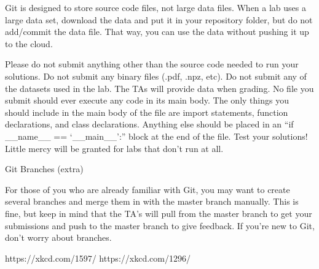 Git is designed to store source code files, not large data files. When a lab uses a large data set, download the data and put it in your repository folder, but do not add/commit the data file. That way, you can use the data without pushing it up to the cloud.

Please do not submit anything other than the source code needed to run your solutions.
Do not submit any binary files (.pdf, .npz, etc).
Do not submit any of the datasets used in the lab. The TAs will provide data when grading.
No file you submit should ever execute any code in its main body. The only things you should include in the main body of the file are import statements, function declarations, and class declarations. Anything else should be placed in an “if \_\_name\_\_ == ‘\_\_main\_\_':” block at the end of the file.
Test your solutions! Little mercy will be granted for labs that don't run at all.

Git Branches (extra)

For those of you who are already familiar with Git, you may want to create several branches and merge them in with the master branch manually. This is fine, but keep in mind that the TA's will pull from the master branch to get your submissions and push to the master branch to give feedback. If you're new to Git, don't worry about branches.


https://xkcd.com/1597/
https://xkcd.com/1296/

